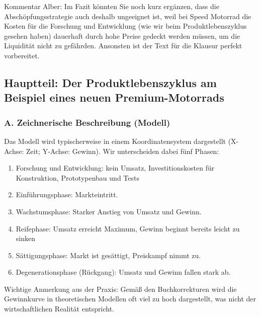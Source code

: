 \documentclass[12pt, a4paper]{article}
\begin{document}
Kommentar Alber: \newline
Im Fazit könnten Sie noch kurz ergänzen, dass die Abschöpfungsstrategie auch deshalb 
ungeeignet ist, weil bei Speed Motorrad die Kosten für die Forschung und Entwicklung
(wie wir beim Produktlebenszyklus gesehen haben) dauerhaft durch hohe Preise gedeckt 
werden müssen, um die Liquidität nicht zu gefährden. Ansonsten ist der Text für die 
Klausur perfekt vorbereitet.

\subsection{Hauptteil: Der Produktlebenszyklus am Beispiel eines neuen Premium-Motorrads}

\subsubsection{A. Zeichnerische Beschreibung (Modell)}
Das Modell wird typischerweise in einem Koordinatensystem dargestellt (X-Achse: Zeit; Y-Achse: Gewinn). Wir unterscheiden dabei fünf Phasen:
\begin{enumerate}
    \item Forschung und Entwicklung: kein Umsatz, Investitionskosten für Konstruktion, Prototypenbau und Tests 
    \item Einführungsphase: Markteintritt.
    \item Wachstumsphase: Starker Anstieg von Umsatz und Gewinn.
    \item Reifephase: Umsatz erreicht Maximum, Gewinn beginnt bereits leicht zu sinken
    \item Sättigungsphase: Markt ist gesättigt, Preiskampf nimmt zu.
    \item Degenerationsphase (Rückgang): Umsatz und Gewinn fallen stark ab.
\end{enumerate}
   
Wichtige Anmerkung aus der Praxis: Gemäß den Buchkorrekturen wird die Gewinnkurve
in theoretischen Modellen oft viel zu hoch dargestellt, was nicht der wirtschaftlichen Realität entspricht.
\end{document}
